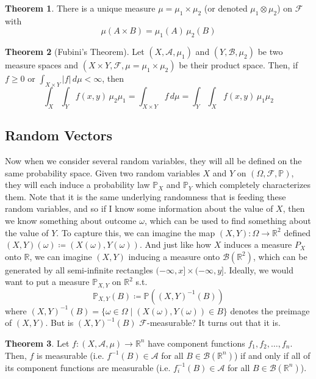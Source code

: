 \documentclass{article}
\theoremstyle{definition}
\newtheorem{theorem}{Theorem}[section]
\theoremstyle{remark}
\theoremstyle{definition}
\begin{document}
\begin{theorem}
There is a unique measure $\mu = \mu_1 \times \mu_2$ (or denoted $\mu_1 \otimes \mu_2$) on $\mathcal{F}$ with 
\[\mu(A \times B) = \mu_1 (A) \, \mu_2 (B)\]
\end{theorem}

\begin{theorem}[Fubini's Theorem]
Let $(X, \mathcal{A}, \mu_1)$ and $(Y, \mathcal{B}, \mu_2)$ be two measure spaces and $(X \times Y, \mathcal{F}, \mu = \mu_1 \times \mu_2)$ be their product space. Then, if $f \geq 0$ or $\int_{X \times Y} |f| \,d\mu < \infty$, then 
\[\int_X \int_Y f(x, y) \, \mu_2 \mu_1 = \int_{X \times Y} f \,d\mu = \int_Y \int_X f(x, y) \, \mu_1 \mu_2\]
\end{theorem}



\subsection{Random Vectors}

Now when we consider several random variables, they will all be defined on the same probability space. Given two random variables $X$ and $Y$ on $(\Omega, \mathcal{F}, \mathbb{P})$, they will each induce a probability law $\mathbb{P}_X$ and $\mathbb{P}_Y$ which completely characterizes them. Note that it is the same underlying randomness that is feeding these random variables, and so if I know some information about the value of $X$, then we know something about outcome $\omega$, which can be used to find something about the value of $Y$. To capture this, we can imagine the map $(X, Y) : \Omega \longrightarrow \mathbb{R}^2$ defined $(X, Y)(\omega) \coloneqq (X(\omega), Y(\omega))$. And just like how $X$ induces a measure $P_X$ onto $\mathbb{R}$, we can imagine $(X, Y)$ inducing a measure onto $\mathcal{B}(\mathbb{R}^2)$, which can be generated by all semi-infinite rectangles $(-\infty, x] \times (-\infty, y]$. Ideally, we would want to put a measure $\mathbb{P}_{X, Y}$ on $\mathbb{R}^2$ s.t. 
\[\mathbb{P}_{X, Y}(B) \coloneqq \mathbb{P}((X, Y)^{-1}(B))\]
where $(X, Y)^{-1}(B) = \{ \omega \in \Omega \mid (X(\omega), Y(\omega)) \in B\}$ denotes the preimage of $(X, Y)$. But is $(X, Y)^{-1}(B)$ $\mathcal{F}$-measurable? It turns out that it is. 

\begin{theorem}
Let $f: (X, \mathcal{A}, \mu) \longrightarrow \mathbb{R}^n$ have component functions $f_1, f_2, \ldots, f_n$. Then, $f$ is measurable (i.e. $f^{-1} (B) \in \mathcal{A}$ for all $B \in \mathcal{B}(\mathbb{R}^n)$) if and only if all of its component functions are measurable (i.e. $f_i^{-1} (B) \in \mathcal{A}$ for all $B \in \mathcal{B}(\mathbb{R}^n)$). 
\end{theorem}
\end{document}
